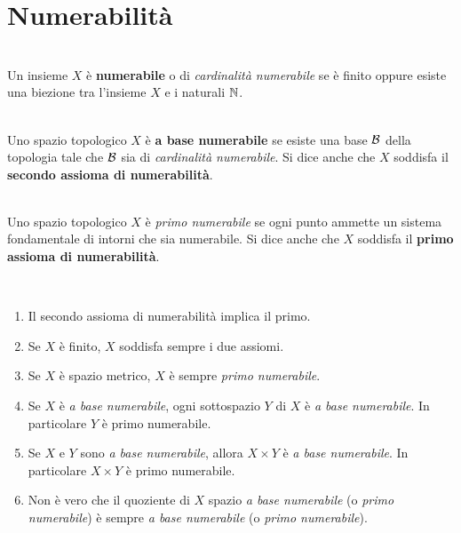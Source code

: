 \section{Numerabilità}
\begin{define}~{}\\
Un insieme $X$ è \textbf{numerabile} o di \textit{cardinalità numerabile} se è finito oppure esiste una biezione tra l'insieme $X$ e i naturali $\mathbb{N}$.
\end{define}
\begin{define}~{}\\
Uno spazio topologico $X$ è \textbf{a base numerabile} se esiste una base $\mathcal{B}$ della topologia tale che $\mathcal{B}$ sia di \textit{cardinalità numerabile}.
Si dice anche che $X$ soddisfa il \textbf{{\small secondo assioma di numerabilità}}.
\end{define}
\begin{define}~{}\\
Uno spazio topologico $X$ è \textit{primo numerabile} se ogni punto ammette un sistema fondamentale di intorni che sia numerabile. Si dice anche che $X$ soddisfa il \textbf{primo assioma di numerabilità}.
\end{define}
\begin{observes}~{}
\begin{enumerate}
\item Il secondo assioma di numerabilità implica il primo.
\item Se $X$ è finito, $X$ soddisfa sempre i due assiomi.
\item Se $X$ è spazio metrico, $X$ è sempre \textit{primo numerabile}.
\item Se $X$ è \textit{a base numerabile}, ogni sottospazio $Y$ di $X$ è \textit{a base numerabile}. In particolare $Y$ è primo numerabile.
\item Se $X$ e $Y$ sono \textit{a base numerabile}, allora $X\times Y$ è \textit{a base numerabile}. In particolare $X\times Y$ è primo numerabile.
\item Non è vero che il quoziente di $X$ spazio \textit{a base numerabile} (o \textit{primo numerabile}) è sempre \textit{a base numerabile} (o \textit{primo numerabile}).
\end{enumerate}
\vspace{-3mm}
\end{observes}
